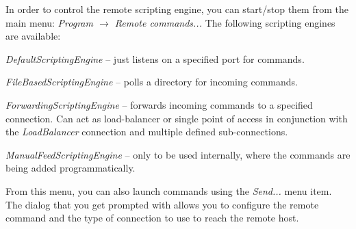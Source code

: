 In order to control the remote scripting engine, you can start/stop them
from the main menu: \textit{Program $\rightarrow$ Remote commands...}
The following scripting engines are available:
\begin{tight_itemize}
  \item \textit{DefaultScriptingEngine} -- just listens on a specified
  port for commands.
  \item \textit{FileBasedScriptingEngine} -- polls a directory for incoming
  commands.
  \item \textit{ForwardingScriptingEngine} -- forwards incoming commands
  to a specified connection. Can act as load-balancer or single point of access
  in conjunction with the \textit{LoadBalancer} connection and multiple defined
  sub-connections.
  \item \textit{ManualFeedScriptingEngine} -- only to be used internally, where
  the commands are being added programmatically.
\end{tight_itemize}

From this menu, you can also launch commands using the \textit{Send...}
menu item. The dialog that you get prompted with allows you to configure
the remote command and the type of connection to use to reach the remote
host.

